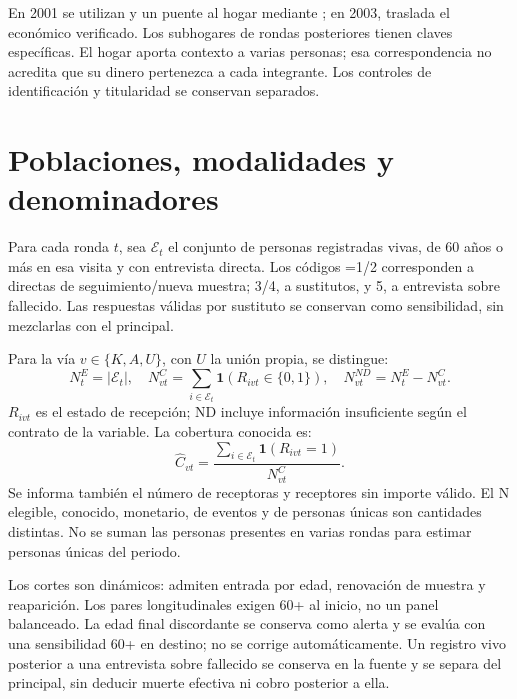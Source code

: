 En 2001 se utilizan  y un puente al hogar mediante
; en 2003,  traslada el
 económico verificado. Los subhogares de rondas posteriores
tienen claves específicas. El hogar aporta contexto a varias personas;
esa correspondencia no acredita que su dinero pertenezca a cada integrante.
Los controles de identificación y titularidad se conservan separados.

\section{Poblaciones, modalidades y denominadores}
\label{sec:poblacion-principal}

Para cada ronda $t$, sea $\mathcal E_t$ el conjunto de personas registradas
vivas, de 60 años o más en esa visita y con entrevista directa. Los códigos
=1/2 corresponden a directas de seguimiento/nueva muestra;
3/4, a sustitutos, y 5, a entrevista sobre fallecido. Las respuestas válidas
por sustituto se conservan como sensibilidad, sin mezclarlas con el principal.

Para la vía $v\in\{K,A,U\}$, con $U$ la unión propia, se distingue:
\begin{equation}
 N_t^{E}=|\mathcal E_t|,\quad
 N_{vt}^{C}=\sum_{i\in\mathcal E_t}\mathbf1(R_{ivt}\in\{0,1\}),\quad
 N_{vt}^{ND}=N_t^{E}-N_{vt}^{C}.
 \label{eq:denominadores}
\end{equation}
$R_{ivt}$ es el estado de recepción; ND incluye información insuficiente
según el contrato de la variable. La cobertura conocida es:
\begin{equation}
 \widehat C_{vt}=
 \frac{\sum_{i\in\mathcal E_t}\mathbf1(R_{ivt}=1)}
 {N_{vt}^{C}}.
 \label{eq:cobertura}
\end{equation}
Se informa también el número de receptoras y receptores sin importe válido.
El N elegible, conocido, monetario, de eventos y de personas únicas son
cantidades distintas. No se suman las personas presentes en varias rondas
para estimar personas únicas del periodo.

Los cortes son dinámicos: admiten entrada por edad, renovación de muestra
y reaparición. Los pares longitudinales exigen 60+ al inicio, no un panel
balanceado. La edad final discordante se conserva como alerta y se evalúa
con una sensibilidad 60+ en destino; no se corrige automáticamente.
Un registro vivo posterior a una entrevista sobre fallecido se conserva en
la fuente y se separa del principal, sin deducir muerte efectiva ni cobro
posterior a ella.

